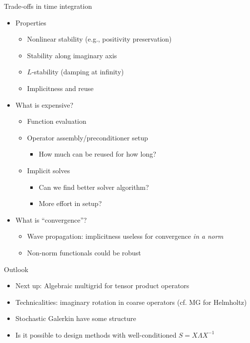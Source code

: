 \documentclass{beamer}
\begin{document}
\begin{frame}{Trade-offs in time integration}
  \begin{itemize}
  \item Properties
    \begin{itemize}
    \item Nonlinear stability (e.g., positivity preservation)
    \item Stability along imaginary axis
    \item $L$-stability (damping at infinity)
    \item Implicitness and reuse
    \end{itemize}
  \item What is expensive?
    \begin{itemize}
    \item Function evaluation
    \item Operator assembly/preconditioner setup
      \begin{itemize}
      \item How much can be reused for how long?
      \end{itemize}
    \item Implicit solves
      \begin{itemize}
      \item Can we find better solver algorithm?
      \item More effort in setup?
      \end{itemize}
    \end{itemize}
  \item What is ``convergence''?
    \begin{itemize}
    \item Wave propagation: implicitness useless for convergence \emph{in a norm}
    \item Non-norm functionals could be robust
    \end{itemize}
  \end{itemize}
\end{frame}

\begin{frame}{Outlook}
  \begin{itemize}
  \item Next up: Algebraic multigrid for tensor product operators
  \item Technicalities: imaginary rotation in coarse operators (cf. MG for Helmholtz)
  \item Stochastic Galerkin have some structure
  \item Is it possible to design methods with well-conditioned $S = X \Lambda X^{-1}$
  \end{itemize}
\end{frame}
\end{document}
